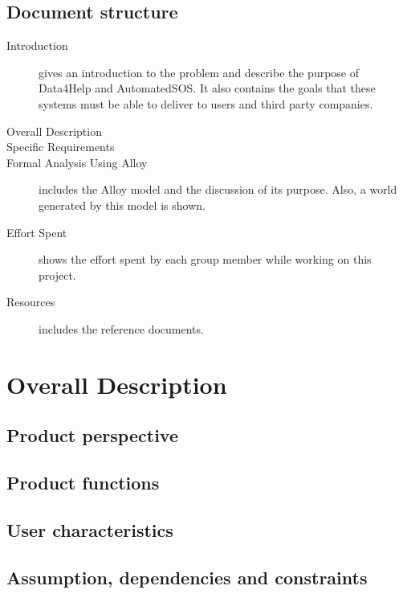 \documentclass{article}
\begin{document}
\subsection{Document structure}
\begin{description}
	\item [Introduction] gives an introduction to the problem and describe the purpose of Data4Help and AutomatedSOS. It also contains the goals that these systems must be able to deliver to users and third party companies.
	\item [Overall Description]
	\item [Specific Requirements]
	\item [Formal Analysis Using Alloy] includes the Alloy model and the discussion of its purpose. Also, a world generated by this model is shown.
	\item [Effort Spent] shows the effort spent by each group member while working on this project.
	\item [Resources] includes the reference documents. 
\end{description}
\section{Overall Description}
\subsection{Product perspective}
\subsection{Product functions}
\subsection{User characteristics}
\subsection{Assumption, dependencies and constraints}
\end{document}
